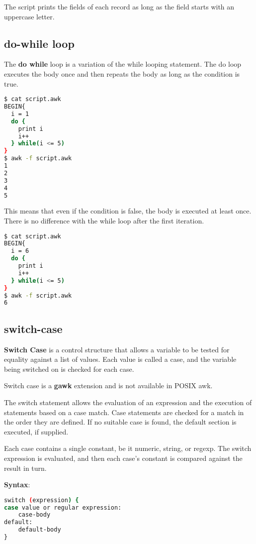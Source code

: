 The script prints the fields of each record as long as the field starts with an uppercase letter.

\subsection{do-while loop}
The \textbf{do while} loop is a variation of the while looping statement.
The do loop executes the body once and then repeats the body as long as the condition is true. 

\begin{lstlisting}[language=bash]
$ cat script.awk
BEGIN{
  i = 1
  do {
    print i
    i++
  } while(i <= 5)
}
$ awk -f script.awk
1
2
3
4
5
\end{lstlisting}

This means that even if the condition is false, the body is executed at least once.
There is no difference with the while loop after the first iteration.

\begin{lstlisting}[language=bash]
$ cat script.awk
BEGIN{
  i = 6
  do {
    print i
    i++
  } while(i <= 5)
}
$ awk -f script.awk
6
\end{lstlisting}

\subsection{switch-case}

\textbf{Switch Case} is a control structure that allows a variable to be tested for equality against a list of values.
Each value is called a case, and the variable being switched on is checked for each case.

\begin{remark}
  Switch case is a \textbf{gawk} extension and is not available in POSIX awk.
\end{remark}

The switch statement allows the evaluation of an expression and the execution of statements based on a case match.
Case statements are checked for a match in the order they are defined.
If no suitable case is found, the default section is executed, if supplied.

Each case contains a single constant, be it numeric, string, or regexp.
The switch expression is evaluated, and then each case's constant is compared against the result in turn.

\textbf{Syntax}:
\begin{lstlisting}[language=bash]
switch (expression) {
case value or regular expression:
    case-body
default:
    default-body
}
\end{lstlisting}

